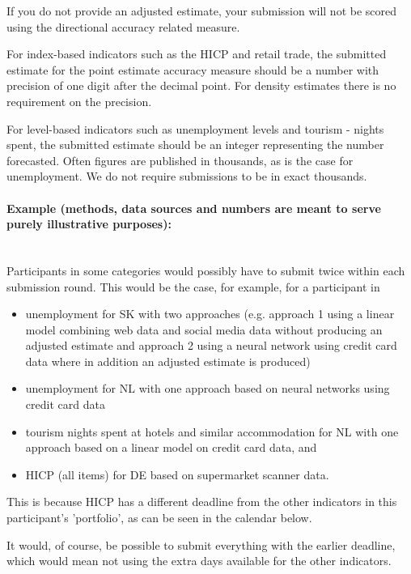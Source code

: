 \documentclass[12pt]{article}
\begin{document}
If you do not provide an adjusted estimate, your submission will not be scored using the directional accuracy related measure.

For index-based indicators such as the HICP and retail trade, the submitted estimate for the point estimate accuracy measure should be a number with precision of one digit after the decimal point. For density estimates there is no requirement on the precision. 

For level-based indicators such as unemployment levels and tourism - nights spent, the submitted estimate should be an integer representing the number forecasted. Often figures are published in thousands, as is the case for unemployment. We do not require submissions to be in exact thousands.

\paragraph{Example (methods, data sources and numbers are meant to serve purely illustrative purposes):}

\textbf{ }\\
 Participants in some categories would possibly have to submit twice within each submission round. This would be the case, for example, for a participant in 

\begin{itemize}
 \item{unemployment for SK with two approaches (e.g. approach 1 using a linear model combining web data and social media data without producing an adjusted estimate and approach 2 using a neural network using credit card data where in addition an adjusted estimate is produced)}
 \item{unemployment for NL with one approach based on neural networks using credit card data}
 \item{tourism nights spent at hotels and similar accommodation for NL with one approach based on a linear model on credit card data, and}
 \item{HICP (all items) for DE based on supermarket scanner data.}
\end{itemize}

This is because HICP has a different deadline from the other indicators in this participant's 'portfolio', as can be seen in the calendar below. 

It would, of course, be possible to submit everything with the earlier deadline, which would mean not using the extra days available for the other indicators. 
\end{document}
